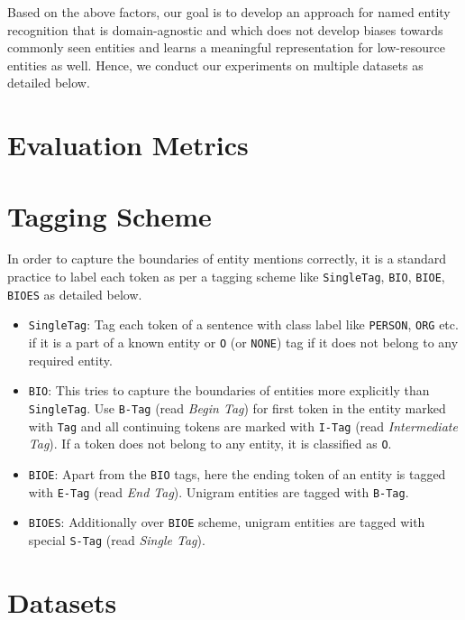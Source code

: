 Based on the above factors, our goal is to develop an approach for named entity recognition that is domain-agnostic and which does not develop biases towards commonly seen entities and learns a meaningful representation for low-resource entities as well. Hence, we conduct our experiments on multiple datasets as detailed below. 

\section{Evaluation Metrics}

\section{Tagging Scheme}
\label{sec:tagging_scheme}
In order to capture the boundaries of entity mentions correctly, it is a standard practice to label each token as per a tagging scheme like \texttt{SingleTag}, \texttt{BIO}, \texttt{BIOE}, \texttt{BIOES} as detailed below.

\begin{itemize}
    \item \texttt{SingleTag}: Tag each token of a sentence with class label like \texttt{PERSON}, \texttt{ORG} etc. if it is a part of a known entity or \texttt{O} (or \texttt{NONE}) tag if it does not belong to any required entity.
    
    \item \texttt{BIO}: This tries to capture the boundaries of entities more explicitly than \texttt{SingleTag}. Use \texttt{B-Tag} (read \textit{Begin Tag}) for first token in the entity marked with \texttt{Tag} and all continuing tokens are marked with \texttt{I-Tag} (read \textit{Intermediate Tag}). If a token does not belong to any entity, it is classified as \texttt{O}.
    
    \item \texttt{BIOE}: Apart from the \texttt{BIO} tags, here the ending token of an entity is tagged with \texttt{E-Tag} (read \textit{End Tag}). Unigram entities are tagged with \texttt{B-Tag}.
    
    \item \texttt{BIOES}: Additionally over \texttt{BIOE} scheme, unigram entities are tagged with special \texttt{S-Tag} (read \textit{Single Tag}).
\end{itemize}

\section{Datasets}

